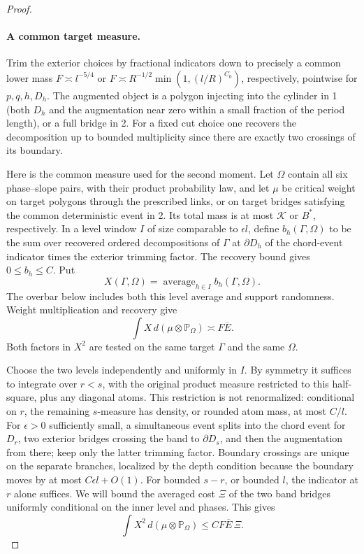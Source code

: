 \begin{proof}
\paragraph{A common target measure.}
Trim the exterior choices by fractional indicators down to precisely a common lower mass \(F\asymp l^{-5/4}\) or \(F\asymp R^{-1/2}\min(1,(l/R)^{C_0})\), respectively, pointwise for \(p,q,h,D_h\). The augmented object is a polygon injecting into the cylinder in 1 (both \(D_h\) and the augmentation near zero within a small fraction of the period length), or a full bridge in 2. For a fixed cut choice one recovers the decomposition up to bounded multiplicity since there are exactly two crossings of its boundary.

Here is the common measure used for the second moment. Let \(\Omega\) contain all six phase--slope pairs, with their product probability law, and let \(\mu\) be critical weight on target polygons through the prescribed links, or on target bridges satisfying the common deterministic event in 2. Its total mass is at most \(\mathcal K\) or \(B^*\), respectively. In a level window \(I\) of size comparable to \(\epsilon l\), define \(b_h(\Gamma,\Omega)\) to be the sum over recovered ordered decompositions of \(\Gamma\) at \(\partial D_h\) of the chord-event indicator times the exterior trimming factor. The recovery bound gives \(0\le b_h\le C\). Put
\[
 X(\Gamma,\Omega)=\mathop{\mathrm{average}}_{h\in I}
 b_h(\Gamma,\Omega).
\]
The overbar below includes both this level average and support randomness. Weight multiplication and recovery give
\begin{equation}\label{eq:sewing-first-moment}
 \int X\,d(\mu\otimes\mathbb P_\Omega)\asymp F\overline E.
\end{equation}
Both factors in \(X^2\) are tested on the same target \(\Gamma\) and the same \(\Omega\).

Choose the two levels independently and uniformly in \(I\). By symmetry it suffices to integrate over \(r<s\), with the original product measure restricted to this half-square, plus any diagonal atoms. This restriction is not renormalized: conditional on \(r\), the remaining \(s\)-measure has density, or rounded atom mass, at most \(C/l\). For \(\epsilon>0\) sufficiently small, a simultaneous event splits into the chord event for \(D_r\), two exterior bridges crossing the band to \(\partial D_s\), and then the augmentation from there; keep only the latter trimming factor. Boundary crossings are unique on the separate branches, localized by the depth condition because the boundary moves by at most \(C\epsilon l+O(1)\). For bounded \(s-r\), or bounded \(l\), the indicator at \(r\) alone suffices. We will bound the averaged cost \(\Xi\) of the two band bridges uniformly conditional on the inner level and phases. This gives
\begin{equation}\label{eq:sewing-second-moment}
 \int X^2\,d(\mu\otimes\mathbb P_\Omega)
 \le CF\overline E\,\Xi.
\end{equation}


\end{proof}
